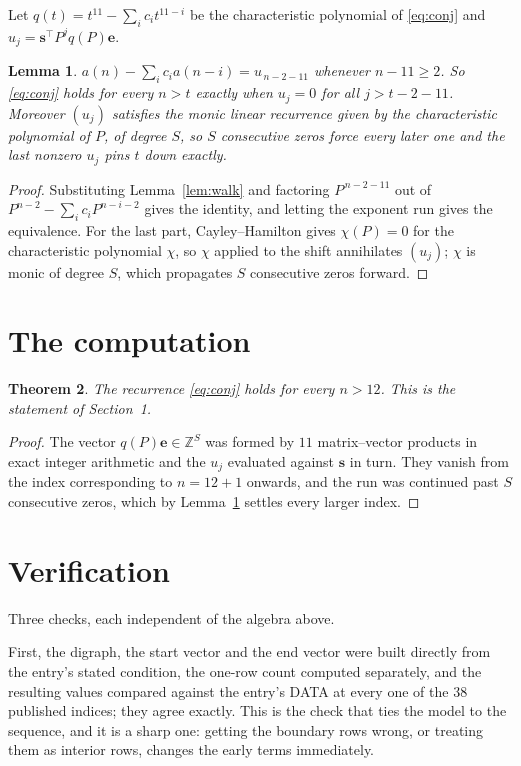 \documentclass[11pt,a4paper]{article}
\theoremstyle{plain}
\newtheorem{theorem}{Theorem}
\newtheorem{lemma}[theorem]{Lemma}
\theoremstyle{definition}
\begin{document}
Let $q(t)=t^{11}-\sum_i c_i t^{11-i}$ be the characteristic polynomial of
\eqref{eq:conj} and $u_j=\mathbf{s}^{\!\top}P^{j}q(P)\mathbf{e}$.

\begin{lemma}\label{lem:crit}
$a(n)-\sum_i c_i a(n-i)=u_{\,n-2-11}$ whenever $n-11\ge2$. So \eqref{eq:conj}
holds for every $n>t$ exactly when $u_j=0$ for all $j>t-2-11$. Moreover $(u_j)$
satisfies the monic linear recurrence given by the characteristic polynomial of $P$, of
degree $S$, so $S$ consecutive zeros force every later one and the last nonzero $u_j$ pins
$t$ down exactly.
\end{lemma}

\begin{proof}
Substituting Lemma~\ref{lem:walk} and factoring $P^{\,n-2-11}$ out of
$P^{n-2}-\sum_i c_i P^{n-i-2}$ gives the identity, and letting the exponent run gives the
equivalence. For the last part, Cayley--Hamilton gives $\chi(P)=0$ for the characteristic
polynomial $\chi$, so $\chi$ applied to the shift annihilates $(u_j)$; $\chi$ is monic of
degree $S$, which propagates $S$ consecutive zeros forward.
\end{proof}

\section{The computation}

\begin{theorem}
The recurrence \eqref{eq:conj} holds for every $n>12$. This is the statement of
Section~1.
\end{theorem}

\begin{proof}
The vector $q(P)\mathbf{e}\in\mathbb{Z}^{S}$ was formed by $11$ matrix--vector
products in exact integer arithmetic and the $u_j$ evaluated against $\mathbf{s}$ in turn.
They vanish from the index corresponding to $n=12+1$ onwards, and the run was continued
past $S$ consecutive zeros, which by Lemma~\ref{lem:crit} settles every larger index.
\end{proof}

\section{Verification}

Three checks, each independent of the algebra above.

First, the digraph, the start vector and the end vector were built directly from the
entry's stated condition, the one-row count computed separately, and the resulting values
compared against the entry's DATA at every one of the $38$ published indices; they
agree exactly. This is the check that ties the model to the sequence, and it is a sharp one:
getting the boundary rows wrong, or treating them as interior rows, changes the early terms
immediately.
\end{document}
